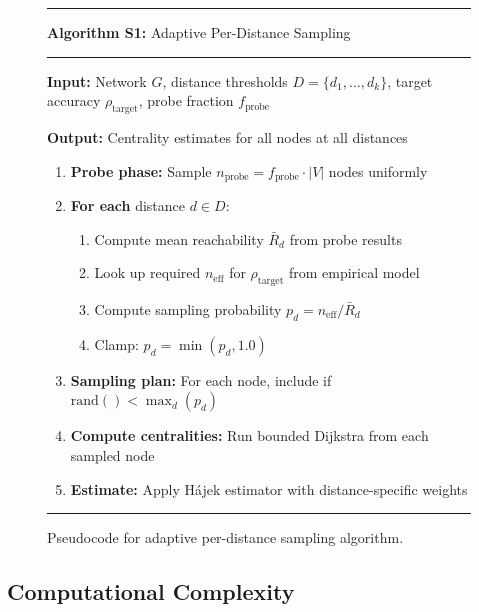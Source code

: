 \documentclass[11pt,a4paper]{article}
\newcommand{\effn}{\ensuremath{n_{\text{eff}}}}
\begin{document}
\begin{figure}[htbp]
\centering
\begin{minipage}{0.9\textwidth}
\hrule
\vspace{0.5em}
\textbf{Algorithm S1:} Adaptive Per-Distance Sampling
\vspace{0.5em}
\hrule
\vspace{0.5em}
\textbf{Input:} Network $G$, distance thresholds $D = \{d_1, \ldots, d_k\}$, target accuracy $\rho_{\text{target}}$, probe fraction $f_{\text{probe}}$
\vspace{0.5em}

\textbf{Output:} Centrality estimates for all nodes at all distances
\vspace{0.5em}

\begin{enumerate}
    \item \textbf{Probe phase:} Sample $n_{\text{probe}} = f_{\text{probe}} \cdot |V|$ nodes uniformly
    \item \textbf{For each} distance $d \in D$:
    \begin{enumerate}
        \item Compute mean reachability $\bar{R}_d$ from probe results
        \item Look up required $\effn$ for $\rho_{\text{target}}$ from empirical model
        \item Compute sampling probability $p_d = \effn / \bar{R}_d$
        \item Clamp: $p_d = \min(p_d, 1.0)$
    \end{enumerate}
    \item \textbf{Sampling plan:} For each node, include if $\text{rand}() < \max_d(p_d)$
    \item \textbf{Compute centralities:} Run bounded Dijkstra from each sampled node
    \item \textbf{Estimate:} Apply H\'{a}jek estimator with distance-specific weights
\end{enumerate}
\vspace{0.5em}
\hrule
\end{minipage}
\caption{Pseudocode for adaptive per-distance sampling algorithm.}
\label{alg:adaptive}
\end{figure}

\subsection{Computational Complexity}
\label{sec:complexity}
\end{document}
